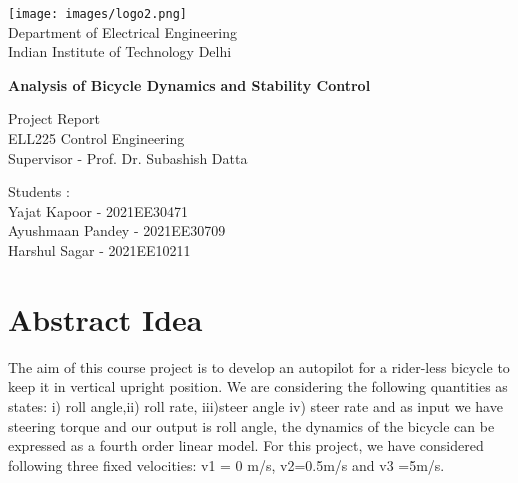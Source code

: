 \documentclass[notitlepage]{article}
\begin{document}
\begin{titlepage}
    \centering
\texttt{[image: images/logo2.png]}    \\
    \vspace{0.5cm}
    {\LARGE  Department of Electrical Engineering \\ }
     {\Large  Indian Institute of Technology Delhi\\
 }

 \vspace{2cm}
    {\huge\bfseries Analysis of Bicycle Dynamics }
    \vspace{0.5cm}
     {\huge\bfseries and Stability Control}

    
    \vspace{2cm}
    {\large  Project Report\\ } 
    \vspace{0.25cm}
{\large  ELL225 Control Engineering \\}
\vspace{0.25cm}
{\large  Supervisor - Prof. Dr. Subashish Datta }

    
    \vfill
    {\large  Students :\\ } 
    \vspace{0.25cm}
    {\large  Yajat Kapoor - 2021EE30471\\ } 
    \vspace{0.25cm}
{\large Ayushmaan Pandey - 2021EE30709 \\}
\vspace{0.25cm}
{\large  Harshul Sagar - 2021EE10211\\ }
\end{titlepage}
\pagebreak
\tableofcontents
\pagebreak
\section{Abstract Idea}
\small The aim of this course project is to develop an autopilot for a rider-less bicycle to keep it in vertical upright position. We are considering the following quantities as states: i) roll angle,ii) roll rate, iii)steer angle iv) steer rate and as input we have steering torque and our output is roll angle, the dynamics of the bicycle can be expressed as a fourth order linear model. For this project, we have considered following three fixed velocities: v1 = 0 m/s, v2=0.5m/s and v3 =5m/s.
\vspace{1mm}
\end{document}
